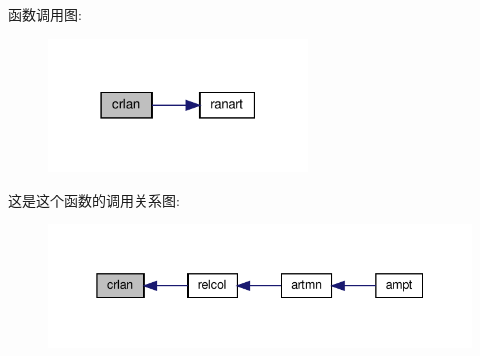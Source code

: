 函数调用图\+:
\nopagebreak
\begin{figure}[H]
\begin{center}
\leavevmode
\includegraphics[width=195pt]{crlan_8f90_a422f078f2d0856902b4e2cd0eaf2d298_cgraph}
\end{center}
\end{figure}
这是这个函数的调用关系图\+:
\nopagebreak
\begin{figure}[H]
\begin{center}
\leavevmode
\includegraphics[width=345pt]{crlan_8f90_a422f078f2d0856902b4e2cd0eaf2d298_icgraph}
\end{center}
\end{figure}
